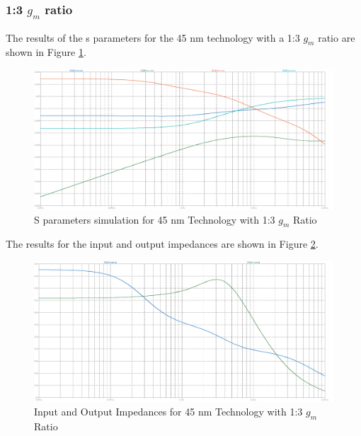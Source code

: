 \subsubsection{1:3 $g_m$ ratio}

The results of the s parameters for the 45 nm technology with a 1:3 $g_m$ ratio are shown in Figure \ref{fig:SParam45nm1to3}. 
\begin{figure}[H]
    \centering
    \includegraphics[width=1\textwidth]{Images/SParam_45_1To3.png}
    \caption{S parameters simulation for 45 nm Technology with 1:3 $g_m$ Ratio}
    \label{fig:SParam45nm1to3}
\end{figure}

The results for the input and output impedances are shown in Figure \ref{fig:ZParam45nm1to3}.

\begin{figure}[H]
    \centering
    \includegraphics[width=1\textwidth]{Images/Imp_45_1To3.png}
    \caption{Input and Output Impedances for 45 nm Technology with 1:3 $g_m$ Ratio}
    \label{fig:ZParam45nm1to3}
\end{figure}

